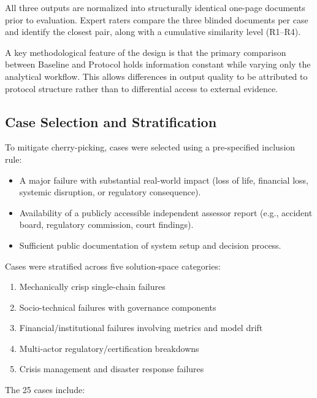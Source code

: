 All three outputs are normalized into structurally identical one-page documents prior to evaluation. Expert raters compare the three blinded documents per case and identify the closest pair, along with a cumulative similarity level (R1--R4).

A key methodological feature of the design is that the primary comparison
between Baseline and Protocol holds information constant while varying only
the analytical workflow. This allows differences in output quality to be
attributed to protocol structure rather than to differential access to
external evidence.

\subsection{Case Selection and Stratification}

To mitigate cherry-picking, cases were selected using a pre-specified inclusion rule:

\begin{itemize}
    \item A major failure with substantial real-world impact (loss of life, financial loss, systemic disruption, or regulatory consequence).
    \item Availability of a publicly accessible independent assessor report (e.g., accident board, regulatory commission, court findings).
    \item Sufficient public documentation of system setup and decision process.
\end{itemize}

Cases were stratified across five solution-space categories:

\begin{enumerate}
    \item Mechanically crisp single-chain failures
    \item Socio-technical failures with governance components
    \item Financial/institutional failures involving metrics and model drift
    \item Multi-actor regulatory/certification breakdowns
    \item Crisis management and disaster response failures
\end{enumerate}

The 25 cases include:

